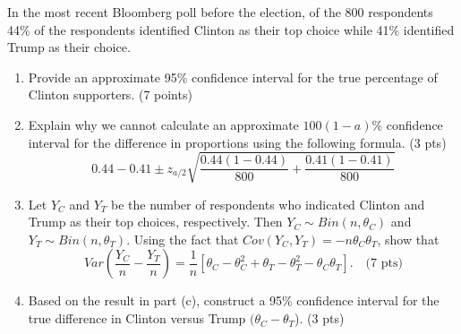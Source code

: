 

\item In the most recent Bloomberg poll before the election, of the 800 
respondents 44\% of the respondents identified Clinton as their top choice 
while 41\% identified Trump as their choice. 

\begin{enumerate}
\item Provide an approximate 95\% confidence interval for the true percentage of 
Clinton supporters. (7 points)

\vfill
\vfill

\item Explain why we cannot calculate an approximate $100(1-a)$\% confidence 
interval for the difference in proportions using the following formula. (3 pts)
\[
0.44 - 0.41 \pm z_{a/2} \sqrt{\frac{0.44(1-0.44)}{800}+\frac{0.41(1-0.41)}{800}}
\]

\vfill

\item Let $Y_C$ and $Y_T$ be the number of respondents who indicated Clinton 
and Trump as their top choices, respectively. Then $Y_C \sim Bin(n,\theta_C)$ 
and $Y_T \sim Bin(n,\theta_T)$. Using the fact that 
$Cov(Y_C,Y_T) = -n\theta_C \theta_T$, show that 
\[
Var\left( \frac{Y_C}{n} - \frac{Y_T}{n}\right) = 
\frac{1}{n}\left[ \theta_C - \theta_C^2 + \theta_T-\theta_T^2 - \theta_C\theta_T \right]. \quad \mbox{(7 pts)}
\]


\vfill
\vfill

\item Based on the result in part (c), construct a 95\% confidence interval for the true difference in Clinton
versus Trump $(\theta_C-\theta_T$). (3 pts)

\ansfont{
\[ 
\hat{\theta}_C - \hat{\theta}_T \pm z_{a/2} \sqrt{\frac{1}{n}\left[ \hat\theta_C - \hat\theta_C^2 + \hat\theta_T-\hat\theta_T^2 - \hat\theta_C\theta_T \right]} =
0.44 - 0.41 \pm 1.96 \sqrt{\frac{1}{800}\left[ 0.44 - 0.44^2 + 0.41-0.41^2 - 0.44\cdot0.41 \right]} = (-0.008, 0.068)
\]
}
\vfill

\end{enumerate}
